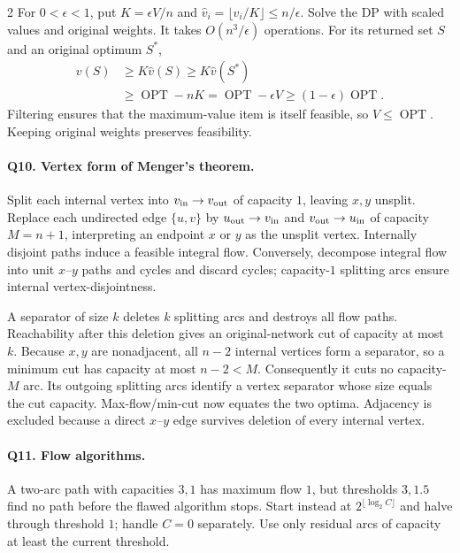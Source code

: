 \documentclass[8pt]{extarticle}
\theoremstyle{definition}
\newcommand{\OPT}{\operatorname{OPT}}
\begin{document}
\begin{multicols*}{2}
For $0<\epsilon<1$, put $K=\epsilon V/n$ and
$\widehat v_i=\lfloor v_i/K\rfloor\le n/\epsilon$.  Solve the DP with
scaled values and original weights.  It takes $O(n^3/\epsilon)$ operations.
For its returned set $S$ and an original optimum $S^*$,
\[
\begin{aligned}
v(S)&\ge K\widehat v(S)\ge K\widehat v(S^*)\\
&\ge\OPT-nK=\OPT-\epsilon V\ge(1-\epsilon)\OPT.
\end{aligned}
\]
Filtering ensures that the maximum-value item is itself feasible, so
$V\le\OPT$.  Keeping original weights preserves feasibility.

\paragraph{Q10. Vertex form of Menger's theorem.}
Split each internal vertex into $v_{\rm in}\to v_{\rm out}$ of capacity
$1$, leaving $x,y$ unsplit.  Replace each undirected edge $\{u,v\}$ by
$u_{\rm out}\to v_{\rm in}$ and $v_{\rm out}\to u_{\rm in}$ of capacity
$M=n+1$, interpreting an endpoint $x$ or $y$ as the unsplit vertex.
Internally disjoint paths induce a feasible integral flow.  Conversely,
decompose integral flow into unit $x$--$y$ paths and cycles and discard
cycles; capacity-$1$ splitting arcs ensure internal vertex-disjointness.

A separator of size $k$ deletes $k$ splitting arcs and destroys all flow
paths.  Reachability after this deletion gives an original-network cut
of capacity at most $k$.  Because $x,y$ are nonadjacent, all $n-2$ internal
vertices form a separator, so a minimum cut has capacity at most
$n-2<M$.  Consequently it cuts no capacity-$M$ arc.  Its outgoing splitting
arcs identify a vertex separator whose size equals the cut capacity.
Max-flow/min-cut now equates the two optima.  Adjacency is excluded because
a direct $x$--$y$ edge survives deletion of every internal vertex.

\paragraph{Q11. Flow algorithms.}
A two-arc path with capacities $3,1$ has maximum flow $1$, but thresholds
$3,1.5$ find no path before the flawed algorithm stops.  Start instead at
$2^{\lfloor\log_2 C\rfloor}$ and halve through threshold $1$; handle $C=0$
separately.  Use only residual arcs of capacity at least the current threshold.


\end{multicols*}
\end{document}
